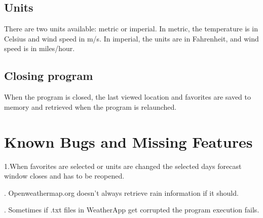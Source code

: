\documentclass[a4paper,10pt]{article}
\begin{document}
\subsection{Units}

There are two units available: metric or imperial. In metric, the temperature is in Celsius and wind speed in m/s. In imperial, the units are in Fahrenheit, and wind speed is in miles/hour.

\subsection{Closing program}

When the program is closed, the last viewed location and favorites are saved to memory and retrieved when the program is relaunched.


\section{Known Bugs and Missing Features}

1.When favorites are selected or units are changed the selected days forecast window closes and has to be reopened.

. Openweathermap.org doesn't always retrieve rain information if it should.

. Sometimes if .txt files in WeatherApp get corrupted the program execution fails.
\end{document}
